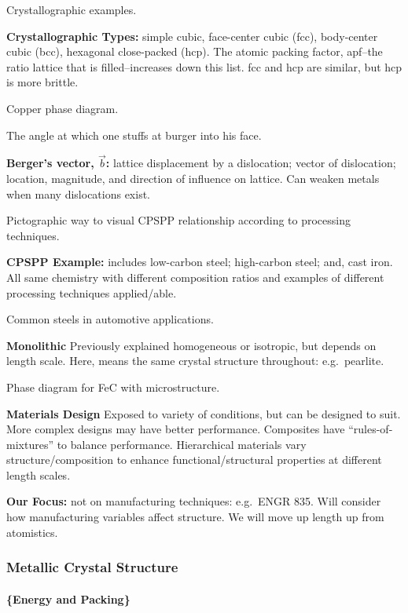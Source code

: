 \documentclass[
]{article}
\begin{document}
{Crystallographic examples.}

\textbf{Crystallographic Types:} simple cubic, face-center cubic (fcc),
body-center cubic (bcc), hexagonal close-packed (hcp). The atomic
packing factor, apf--the ratio lattice that is filled--increases down
this list. fcc and hcp are similar, but hcp is more brittle.

{Copper phase diagram.}

{The angle at which one stuffs at burger into his face.}

\textbf{\textbf{Berger's vector, $\vec{b}$}:} lattice displacement by a
dislocation; vector of dislocation; location, magnitude, and direction
of influence on lattice. Can weaken metals when many dislocations exist.

{Pictographic way to visual CPSPP relationship according to processing
techniques.}

\textbf{CPSPP Example:} includes low-carbon steel; high-carbon steel;
and, cast iron. All same chemistry with different composition ratios and
examples of different processing techniques applied/able.

{Common steels in automotive applications.}

\textbf{Monolithic} Previously explained homogeneous or isotropic, but
depends on length scale. Here, means the same crystal structure
throughout: e.g.~pearlite.

{Phase diagram for FeC with microstructure.}

\textbf{Materials Design} Exposed to variety of conditions, but can be
designed to suit. More complex designs may have better performance.
Composites have ``rules-of-mixtures'' to balance performance.
Hierarchical materials vary structure/composition to enhance
functional/structural properties at different length scales.

\textbf{Our Focus:} not on manufacturing techniques: e.g.~ENGR 835. Will
consider how manufacturing variables affect structure. We will move up
length up from atomistics.

\hypertarget{metallic-crystal-structure}{%
\subsubsection{Metallic Crystal
Structure}\label{metallic-crystal-structure}}

\hypertarget{energy-and-packing}{%
\paragraph{\{Energy and Packing\}}\label{energy-and-packing}}
\end{document}
